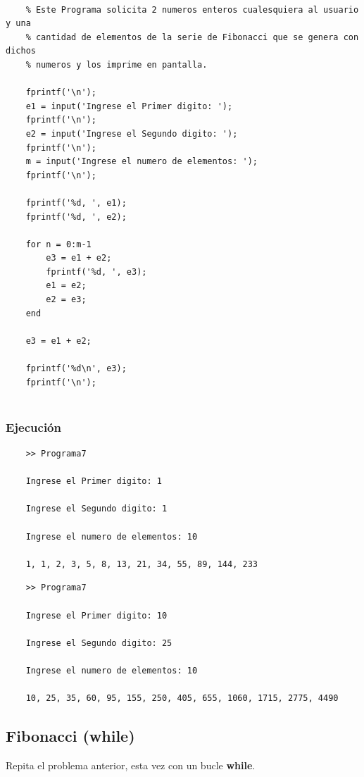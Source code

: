 \documentclass{article}
\begin{document}
	\begin{lstlisting}
	
	% Este Programa solicita 2 numeros enteros cualesquiera al usuario y una
	% cantidad de elementos de la serie de Fibonacci que se genera con dichos
	% numeros y los imprime en pantalla.
	
	fprintf('\n');
	e1 = input('Ingrese el Primer digito: ');
	fprintf('\n');
	e2 = input('Ingrese el Segundo digito: ');
	fprintf('\n');
	m = input('Ingrese el numero de elementos: ');
	fprintf('\n');
	
	fprintf('%d, ', e1);
	fprintf('%d, ', e2);
	
	for n = 0:m-1
		e3 = e1 + e2;
		fprintf('%d, ', e3);
		e1 = e2;
		e2 = e3;
	end
	
	e3 = e1 + e2;
	
	fprintf('%d\n', e3);
	fprintf('\n');
	
	\end{lstlisting}
	
	\subsubsection{Ejecución}
	
	\begin{lstlisting}
	>> Programa7
	
	Ingrese el Primer digito: 1
	
	Ingrese el Segundo digito: 1
	
	Ingrese el numero de elementos: 10
	
	1, 1, 2, 3, 5, 8, 13, 21, 34, 55, 89, 144, 233
	\end{lstlisting}
	
	\begin{lstlisting}
	>> Programa7
	
	Ingrese el Primer digito: 10
	
	Ingrese el Segundo digito: 25
	
	Ingrese el numero de elementos: 10
	
	10, 25, 35, 60, 95, 155, 250, 405, 655, 1060, 1715, 2775, 4490
	\end{lstlisting}
	
	\newpage
	
	\subsection{Fibonacci (while)}
	
	Repita el problema anterior, esta vez con un bucle \textbf{while}.
	
\end{document}
